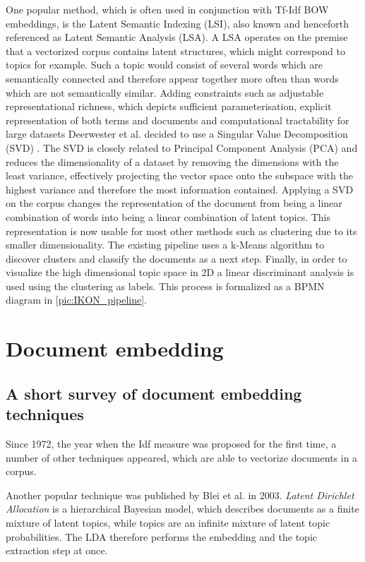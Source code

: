 One popular method, which is often used in conjunction with Tf-Idf BOW embeddings, is the Latent Semantic Indexing (LSI), also known and henceforth referenced as Latent Semantic Analysis (LSA). A LSA operates on the premise that a vectorized corpus contains latent structures, which might correspond to topics for example. Such a topic would consist of several words which are semantically connected and therefore appear together more often than words which are not semantically similar. Adding constraints such as adjustable representational richness, which depicts sufficient parameterisation, explicit representation of both terms and documents and computational tractability for large datasets Deerwester et al. decided to use a Singular Value Decomposition (SVD) \cite{deerwesterIndexingLatentSemantic}. The SVD is closely related to Principal Component Analysis (PCA) and reduces the dimensionality of a dataset by removing the dimensions with the least variance, effectively projecting the vector space onto the subspace with the highest variance and therefore the most information contained. Applying a SVD on the corpus changes the representation of the document from being a linear combination of words into being a linear combination of latent topics. This representation is now usable for most other methods such as clustering due to its smaller dimensionality. The existing pipeline uses a k-Means algorithm to discover clusters and classify the documents as a next step. Finally, in order to visualize the high dimensional topic space in 2D a linear discriminant analysis is used using the clustering as labels. This process is formalized as a BPMN diagram in \autoref{pic:IKON_pipeline}.


\section{Document embedding}

\subsection{A short survey of document embedding techniques}
Since 1972, the year when the Idf measure was proposed for the first time, \cite{robertsonUnderstandingInverseDocument2004} a number of other techniques appeared, which are able to vectorize documents in a corpus.

Another popular technique was published by Blei et al. \cite{bleiLatentDirichletAllocation2003} in 2003. \textit{Latent Dirichlet Allocation} is a hierarchical Bayesian model, which describes documents as a finite mixture of latent topics, while topics are an infinite mixture of latent topic probabilities. The LDA therefore performs the embedding and the topic extraction step at once.


